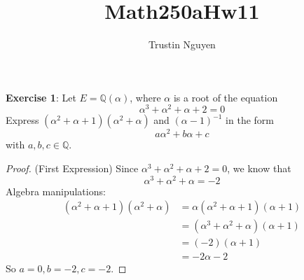 \documentclass{article}
\title{Math250aHw11}
\author{Trustin Nguyen}
\begin{document}
    \maketitle

\reversemarginpar

\textbf{Exercise 1}: Let $E = \mathbb{Q}(\alpha)$, where $\alpha$ is a root of the equation
    \begin{equation*}
        \alpha^{3} + \alpha^{2} + \alpha + 2 = 0
    \end{equation*}
Express $(\alpha^{2} + \alpha + 1)(\alpha^{2} + \alpha)$ and $(\alpha - 1)^{-1}$ in the form
    \begin{equation*}
        a\alpha^{2} + b\alpha + c
    \end{equation*}
with $a, b, c \in \mathbb{Q}$.
    \begin{proof}
        (First Expression) Since $\alpha^{3} + \alpha^{2} + \alpha + 2 = 0$, we know that 
            \begin{equation*}
                \alpha^{3} + \alpha^{2} + \alpha  = -2
            \end{equation*}
        Algebra manipulations:
            \begin{align*}
                (\alpha^{2} + \alpha + 1)(\alpha^{2} + \alpha) &= \alpha (\alpha^{2} + \alpha + 1)(\alpha + 1) \\
                                                               &= (\alpha^{3} + \alpha^{2} + \alpha) (\alpha + 1)\\
                                                               &= (-2)(\alpha + 1) \\
                                                               &= -2\alpha - 2
            \end{align*}
        So $a = 0, b = -2, c = -2$.


\end{proof}
\end{document}
